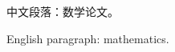 \documentclass[fontset=fandol]{ctexart}
\begin{document}
中文段落：数学论文。

English paragraph: mathematics.
\end{document}

